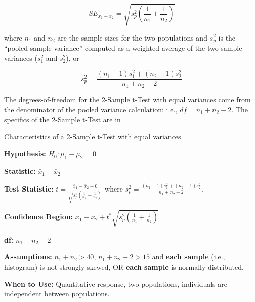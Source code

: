\documentclass[10pt,openany]{book}\usepackage[]{graphicx}\usepackage[]{color}
\begin{document}
\[ SE_{\bar{x}_{1}-\bar{x}_{2}}= \sqrt{s_{p}^{2}\left(\frac{1}{n_{1}}+\frac{1}{n_{2}} \right)}  \]

where $n_{1}$ and $n_{2}$ are the sample sizes for the two populations and $s_{p}^{2}$ is the ``pooled sample variance'' computed as a weighted average of the two sample variances ($s_{1}^{2}$ and $s_{2}^{2}$), or

\[s_{p}^{2}=\frac{(n_{1}-1)s_{1}^{2}+(n_{2}-1)s_{2}^{2}}{n_{1}+n_{2}-2} \]

The degrees-of-freedom for the 2-Sample t-Test with equal variances come from the denominator of the pooled variance calculation; i.e., $df=n_{1}+n_{2}-2$.  The specifics of the 2-Sample t-Test are in .


\begin{table}[h]
\centering
\colorbox{ltgray}{
\begin{minipage}{.8\textwidth}
  \centering
	\caption{Characteristics of a 2-Sample t-Test with equal variances.}\label{tab:2tspec}
  \begin{Itemize}
      \item \textbf{Hypothesis:} $H_{0}:\mu_{1}-\mu_{2}=0$
      \item \textbf{Statistic:} $\bar{x}_{1}-\bar{x}_{2}$
      \item \textbf{Test Statistic:} $t=\frac{\bar{x}_{1}-\bar{x}_{2}-0}{\sqrt{s_{p}^{2}\left(\frac{1}{n_{1}}+\frac{1}{n_{2}} \right)}}$ where $s_{p}^{2}=\frac{(n_{1}-1)s_{1}^{2}+(n_{2}-1)s_{2}^{2}}{n_{1}+n_{2}-2}$.
      \vspace{6pt}
      \item \textbf{Confidence Region:} $\bar{x}_{1}-\bar{x}_{2}+t^{*}\sqrt{s_{p}^{2}\left(\frac{1}{n_{1}}+\frac{1}{n_{2}} \right)}$
      \vspace{6pt}
      \item \textbf{df:} $n_{1}+n_{2}-2$
      \item \textbf{Assumptions:} $n_{1}+n_{2}>40$, $n_{1}+n_{2}-2>15$ and \textbf{each sample} (i.e., histogram) is not strongly skewed, OR \textbf{each sample} is normally distributed.
      \item \textbf{When to Use:} Quantitative response, two populations, individuals are independent between populations.
  \end{Itemize}
\end{minipage}}
\end{table}
\end{document}
